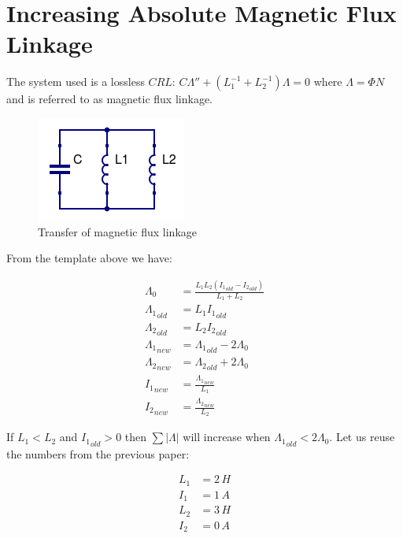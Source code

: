 \documentclass[]{../common/elementary-physics}
\begin{document}
\section{Increasing Absolute Magnetic Flux Linkage}

The system used is a lossless $CRL$\cite{ef3ch}: $C \Lambda'' + (L_1^{-1} + L_2^{-1}) \Lambda = 0$ where $\Lambda = \Phi N$ and is referred to as magnetic flux linkage.

\begin{figure}[ht] \centering
	\includegraphics[scale=.5]{CLL} \caption{Transfer of magnetic flux linkage}
\end{figure}

From the template above we have:

\begin{subequations}
\begin{align}
\Lambda_0 &= \frac{L_1 L_2 ({I_1}_{old}-{I_2}_{old})}{L_1 + L_2} \\
{\Lambda_1}_{old} &= L_1 {I_1}_{old} \\
{\Lambda_2}_{old} &= L_2 {I_2}_{old} \\
{\Lambda_1}_{new} &= {\Lambda_1}_{old} -2 \Lambda_0 \\
{\Lambda_2}_{new} &= {\Lambda_2}_{old} +2 \Lambda_0 \\
{I_1}_{new} &= \frac{{\Lambda_1}_{new}}{L_1} \\
{I_2}_{new} &= \frac{{\Lambda_2}_{new}}{L_2}
\end{align}
\end{subequations}

If $L_1 < L_2$ and ${I_1}_{old} > 0$ then $\sum |\Lambda|$ will increase when ${\Lambda_1}_{old} < 2 \Lambda_0$.
Let us reuse the numbers from the previous paper\cite{ef2ch}:

\begin{subequations}
\begin{align}
L_1 &= 2 \, H \\
I_1 &= 1 \, A \\
L_2 &= 3 \, H \\
I_2 &= 0 \, A
\end{align}
\end{subequations}
\end{document}
